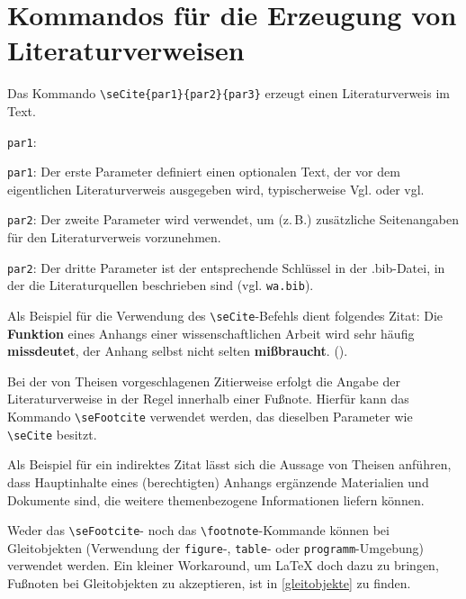 %
%
%
\section{Kommandos f\"ur die Erzeugung von Literaturverweisen}

Das Kommando \verb+\seCite{par1}{par2}{par3}+ erzeugt einen Literaturverweis im Text. 

\begin{seToplist}{\texttt{par1}:}
\item[\texttt{par1}:] Der erste Parameter  definiert einen optionalen Text, der vor dem eigentlichen Literaturverweis ausgegeben 
                               wird, typischerweise Vgl. oder vgl.
\item[\texttt{par2}:] Der zweite Parameter  wird verwendet, um (z.\,B.) zus\"atzliche Seitenangaben f\"ur den Literaturverweis 
                              vorzunehmen.
\item[\texttt{par2}:] Der dritte Parameter ist der entsprechende Schl\"ussel in der .bib-Datei, in der die Literaturquellen 
                              beschrieben sind (vgl. \texttt{wa.bib}).                                                                                       
\end{seToplist}

Als Beispiel f\"ur die Verwendung des \verb+\seCite+-Befehls dient folgendes Zitat: \glqq{}Die \textbf{Funktion} eines 
Anhangs einer wissenschaftlichen Arbeit wird sehr h\"aufig \textbf{missdeutet}, der Anhang selbst nicht selten \textbf{mi{\ss}braucht}.\grqq{} 
().

Bei der von Theisen vorgeschlagenen Zitierweise erfolgt die Angabe der Literaturverweise in der Regel innerhalb einer Fu{\ss}note. 
Hierf\"ur kann das Kommando \verb+\seFootcite+ verwendet werden, das dieselben Parameter wie \verb+\seCite+ besitzt. 

Als Beispiel f\"ur ein indirektes Zitat l\"asst sich die Aussage von Theisen anf\"uhren, dass Hauptinhalte eines (berechtigten) Anhangs erg\"anzende 
Materialien und Dokumente sind, die weitere themenbezogene Informationen liefern k\"onnen.

Weder das \verb+\seFootcite+- noch das \verb+\footnote+-Kommande k\"onnen bei Gleitobjekten (Verwendung der \verb+figure+-, \verb+table+- oder 
\verb+programm+-Umgebung) verwendet werden. Ein kleiner Workaround, um \LaTeX{} doch dazu zu bringen, Fu{\ss}noten bei Gleitobjekten 
zu akzeptieren, ist in \vref{gleitobjekte} zu finden.